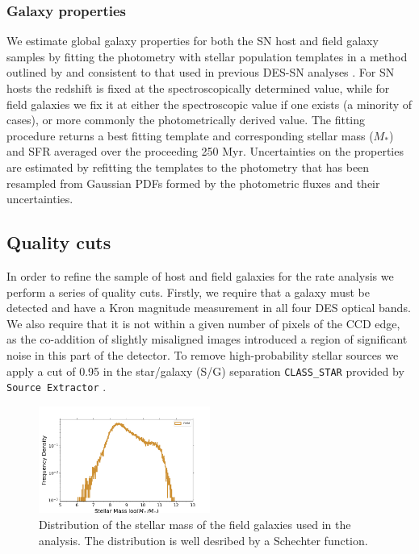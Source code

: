 \documentclass[fleqn,usenatbib]{mnras}
\begin{document}
\subsubsection{Galaxy properties \label{subsubsec:properties}}

We estimate global galaxy properties for both the SN host and field galaxy samples by fitting the photometry with stellar population templates in a method outlined by \citet{Sullivan2006} and consistent to that used in previous DES-SN analyses \citep{Kelsey2020,Smith2020,Wiseman2020}. For SN hosts the redshift is fixed at the spectroscopically determined value, while for field galaxies we fix it at either the spectroscopic value if one exists (a minority of cases), or more commonly the photometrically derived value. The fitting procedure returns a best fitting template and corresponding stellar mass ($M_*$) and SFR averaged over the proceeding 250 Myr. Uncertainties on the properties are estimated by refitting the templates to the photometry that has been resampled from Gaussian PDFs formed by the photometric fluxes and their uncertainties. 

\subsection{Quality cuts \label{subsec:cuts}}

In order to refine the sample of host and field galaxies for the rate analysis we perform a series of quality cuts. Firstly, we require that a galaxy must be detected and have a Kron magnitude measurement in all four DES optical bands. We also require that it is not within a given number of pixels of the CCD edge, as the co-addition of slightly misaligned images introduced a region of significant noise in this part of the detector. To remove high-probability stellar sources we apply a cut of 0.95 in the star/galaxy (S/G) separation \texttt{CLASS\_STAR} provided by \texttt{Source Extractor} \citep{Bertin1996}. 

\begin{figure}
\includegraphics[width=0.5\textwidth]{figs/mass_hist_log.png}
\caption{Distribution of the stellar mass of the field galaxies used in the analysis. The distribution is well desribed by a Schechter function.
\label{fig:log_mass_field}}
\end{figure}
\end{document}
